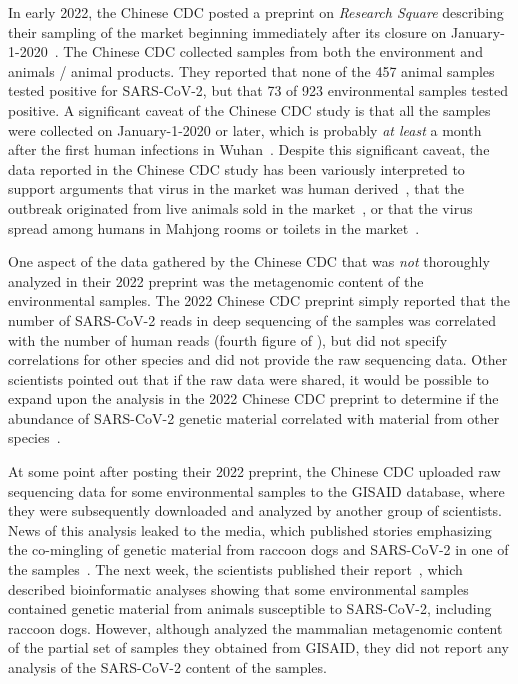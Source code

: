 \documentclass[9pt,twocolumn,twoside]{gsajnl_modified}
\begin{document}
In early 2022, the Chinese CDC posted a preprint on \textit{Research Square} describing their sampling of the market beginning immediately after its closure on January-1-2020~\citep{liu2022surveillance}.
The Chinese CDC collected samples from both the environment and animals / animal products.
They reported that none of the 457 animal samples tested positive for SARS-CoV-2, but that 73 of 923 environmental samples tested positive.
A significant caveat of the Chinese CDC study is that all the samples were collected on January-1-2020 or later, which is probably \emph{at least} a month after the first human infections in Wuhan~\citep{zhang2020viral,van2020emergence,he2020evaluating,pipes2021assessing,pekar2021timing,odni2022,pekar2022molecular}.
Despite this significant caveat, the data reported in the Chinese CDC study has been variously interpreted to support arguments that virus in the market was human derived~\citep{liu2022surveillance}, that the outbreak originated from live animals sold in the market~\citep{worobey2022huanan}, or that the virus spread among humans in Mahjong rooms or toilets in the market~\citep{courtier2022sars}.

One aspect of the data gathered by the Chinese CDC that was \emph{not} thoroughly analyzed in their 2022 preprint was the metagenomic content of the environmental samples. 
The 2022 Chinese CDC preprint simply reported that the number of SARS-CoV-2 reads in deep sequencing of the samples was correlated with the number of human reads (fourth figure of \citet{liu2022surveillance}), but did not specify correlations for other species and did not provide the raw sequencing data.
Other scientists pointed out that if the raw data were shared, it would be possible to expand upon the analysis in the 2022 Chinese CDC preprint to determine if the abundance of SARS-CoV-2 genetic material correlated with material from other species~\citep{cohen2022anywhere,cohen2022studies}.

At some point after posting their 2022 preprint, the Chinese CDC uploaded raw sequencing data for some environmental samples to the GISAID database, where they were subsequently downloaded and analyzed by another group of scientists.
News of this analysis leaked to the media, which published stories emphasizing the co-mingling of genetic material from raccoon dogs and SARS-CoV-2 in one of the samples~\citep{wu2023atlantic,mueller2023nytimes}.
The next week, the scientists published their report~\citep{crits2023genetic}, which described bioinformatic analyses showing that some environmental samples contained genetic material from animals susceptible to SARS-CoV-2, including raccoon dogs.
However, although \citet{crits2023genetic} analyzed the mammalian metagenomic content of the partial set of samples they obtained from GISAID, they did not report any analysis of the SARS-CoV-2 content of the samples.
\end{document}
